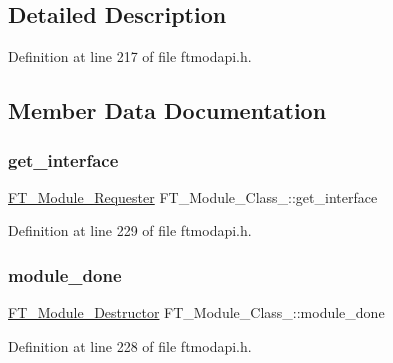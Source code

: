 \subsection{Detailed Description}


Definition at line 217 of file ftmodapi.\+h.



\subsection{Member Data Documentation}
\mbox{\label{struct_f_t___module___class___aa72d79fcd0991231e24e88f359244e8e}} 
\subsubsection{\texorpdfstring{get\_interface}{get\_interface}}
{\footnotesize\ttfamily \mbox{\hyperlink{ftmodapi_8h_af078ba2b906d2553add818593ab784ed}{F\+T\+\_\+\+Module\+\_\+\+Requester}} F\+T\+\_\+\+Module\+\_\+\+Class\+\_\+\+::get\+\_\+interface}



Definition at line 229 of file ftmodapi.\+h.

\mbox{\label{struct_f_t___module___class___ab6e9c780519e24a51144df79692cf339}} 
\subsubsection{\texorpdfstring{module\_done}{module\_done}}
{\footnotesize\ttfamily \mbox{\hyperlink{ftmodapi_8h_a7881ad6a13b0fe28b8473fa7ee6f28c2}{F\+T\+\_\+\+Module\+\_\+\+Destructor}} F\+T\+\_\+\+Module\+\_\+\+Class\+\_\+\+::module\+\_\+done}



Definition at line 228 of file ftmodapi.\+h.

\mbox{\label{struct_f_t___module___class___a54a02a3767955cd8fa0cd786bd1f9515}} 

